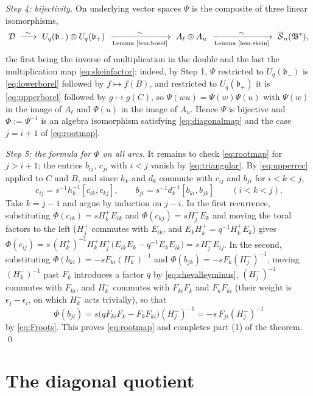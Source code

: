 \documentclass[11pt]{article}
\theoremstyle{remark}
\newcommand{\U}{U_q}
\newcommand{\bp}{\mathfrak b_+}
\newcommand{\bm}{\mathfrak b_-}
\newcommand{\redS}{\overline{\mathcal S}_n}
\newcommand{\Bstar}{\mathfrak B^*}
\newcommand{\ot}{\otimes}
\newcommand{\cD}{\mathcal D}
\begin{document}
\emph{Step 4: bijectivity.} On underlying vector spaces $\Psi$ is the
composite of three linear isomorphisms,
\begin{equation}\label{eq:bijective}
 \cD\ \xrightarrow{\ \sim\ }\ \U(\bm)\ot\U(\bp)
 \ \xrightarrow[\text{Lemma \ref{lem:borel}}]{\ \sim\ }\
 A_\ell\ot A_u
 \ \xrightarrow[\text{Lemma \ref{lem:skein}}]{\ \sim\ }\
 \redS(\Bstar),
\end{equation}
the first being the inverse of multiplication in the double and the
last the multiplication map \eqref{eq:skeinfactor}: indeed, by Step 1,
$\Psi$ restricted to $\U(\bm)$ is \eqref{eq:lowerborel} followed by
$f\mapsto f(B)$, and restricted to $\U(\bp)$ it is \eqref{eq:upperborel}
followed by $g\mapsto g(C)$, so
$\Psi(wu)=\Psi(w)\Psi(u)$ with $\Psi(w)$ in the image of $A_\ell$ and
$\Psi(u)$ in the image of $A_u$. Hence $\Psi$ is bijective and
$\Phi:=\Psi^{-1}$ is an algebra isomorphism satisfying
\eqref{eq:diagonalmap} and the case $j=i+1$ of \eqref{eq:rootmap}.

\emph{Step 5: the formula for $\Phi$ on all arcs.} It remains to check
\eqref{eq:rootmap} for $j>i+1$; the entries $b_{ij}$, $c_{ji}$ with
$i<j$ vanish by \eqref{eq:triangular}. By \eqref{eq:upperrec} applied to
$C$ and $B$, and since $h_k$ and $d_k$ commute with $c_{ij}$ and $b_{ji}$
for $i<k<j$,
\begin{equation}\label{eq:arcrec}
 c_{ij}=s^{-1}h_k^{-1}[c_{ik},c_{kj}],\qquad
 b_{ji}=s^{-1}d_k^{-1}[b_{ki},b_{jk}]\qquad(i<k<j).
\end{equation}
Take $k=j-1$ and argue by induction on $j-i$. In the first recurrence,
substituting $\Phi(c_{ik})=sH^+_kE_{ik}$ and
$\Phi(c_{kj})=sH^+_jE_{k}$ and moving the toral factors to the left
($H^+_j$ commutes with $E_{ik}$, and $E_kH^+_k=q^{-1}H^+_kE_k$) gives
$\Phi(c_{ij})=s\,(H^+_k)^{-1}H^+_kH^+_j
 \bigl(E_{ik}E_k-q^{-1}E_kE_{ik}\bigr)=s\,H^+_jE_{ij}$.
In the second, substituting $\Phi(b_{ki})=-sF_{ki}(H^-_k)^{-1}$ and
$\Phi(b_{jk})=-sF_k(H^-_j)^{-1}$, moving $(H^-_k)^{-1}$ past $F_k$
introduces a factor $q$ by \eqref{eq:chevalleyminus}, $(H^-_j)^{-1}$
commutes with $F_{ki}$, and $H^-_k$ commutes with $F_{ki}F_k$ and
$F_kF_{ki}$ (their weight is $\epsilon_j-\epsilon_i$, on which $H^-_k$
acts trivially), so that
\[
 \Phi(b_{ji})=s\bigl(qF_{ki}F_k-F_kF_{ki}\bigr)(H^-_j)^{-1}
 =-s\,F_{ji}(H^-_j)^{-1}
\]
by \eqref{eq:Froots}. This proves \eqref{eq:rootmap} and completes
part (1) of the theorem. \qed

\section{The diagonal quotient}\label{sec:quotient}
\end{document}
